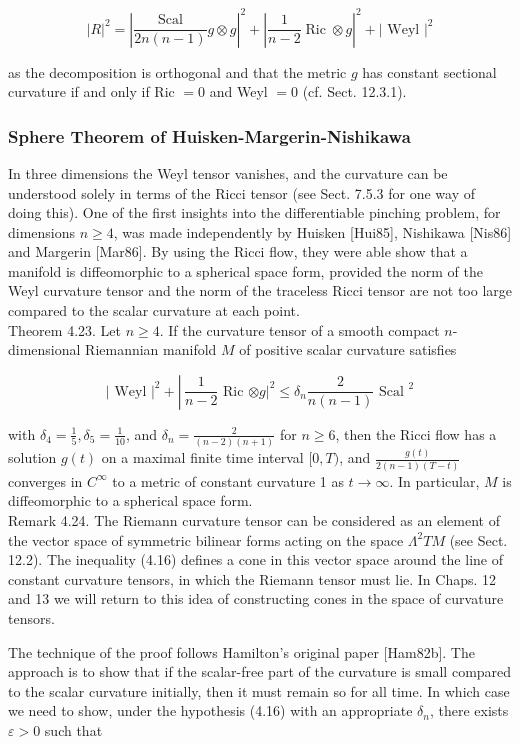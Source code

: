 \documentclass[10pt, letterpaper]{article}
\begin{document}
$$
|R|^{2}=\left|\frac{\text { Scal }}{2 n(n-1)} g \otimes g\right|^{2}+\left|\frac{1}{n-2} \operatorname{Ric} \otimes g\right|^{2}+\mid \text { Weyl }\left.\right|^{2}
$$

as the decomposition is orthogonal and that the metric $g$ has constant sectional curvature if and only if Ric $=0$ and Weyl $=0$ (cf. Sect. 12.3.1).

\subsubsection*{Sphere Theorem of Huisken-Margerin-Nishikawa}
In three dimensions the Weyl tensor vanishes, and the curvature can be understood solely in terms of the Ricci tensor (see Sect. 7.5.3 for one way of doing this). One of the first insights into the differentiable pinching problem, for dimensions $n \geq 4$, was made independently by Huisken [Hui85], Nishikawa [Nis86] and Margerin [Mar86]. By using the Ricci flow, they were able show that a manifold is diffeomorphic to a spherical space form, provided the norm of the Weyl curvature tensor and the norm of the traceless Ricci tensor are not too large compared to the scalar curvature at each point.\\
Theorem 4.23. Let $n \geq 4$. If the curvature tensor of a smooth compact $n$-dimensional Riemannian manifold $M$ of positive scalar curvature satisfies

$$
\mid \text { Weyl }\left.\right|^{2}+\left\lvert\, \frac{1}{n-2}\right. \text { Ric }\left.\otimes g\right|^{2} \leq \delta_{n} \frac{2}{n(n-1)} \text { Scal }^{2}
$$

with $\delta_{4}=\frac{1}{5}, \delta_{5}=\frac{1}{10}$, and $\delta_{n}=\frac{2}{(n-2)(n+1)}$ for $n \geq 6$, then the Ricci flow has a solution $g(t)$ on a maximal finite time interval $[0, T)$, and $\frac{g(t)}{2(n-1)(T-t)}$ converges in $C^{\infty}$ to a metric of constant curvature 1 as $t \rightarrow \infty$. In particular, $M$ is diffeomorphic to a spherical space form.\\
Remark 4.24. The Riemann curvature tensor can be considered as an element of the vector space of symmetric bilinear forms acting on the space $\Lambda^{2} T M$ (see Sect. 12.2). The inequality (4.16) defines a cone in this vector space around the line of constant curvature tensors, in which the Riemann tensor must lie. In Chaps. 12 and 13 we will return to this idea of constructing cones in the space of curvature tensors.

The technique of the proof follows Hamilton's original paper [Ham82b]. The approach is to show that if the scalar-free part of the curvature is small compared to the scalar curvature initially, then it must remain so for all time. In which case we need to show, under the hypothesis (4.16) with an appropriate $\delta_{n}$, there exists $\varepsilon>0$ such that
\end{document}
